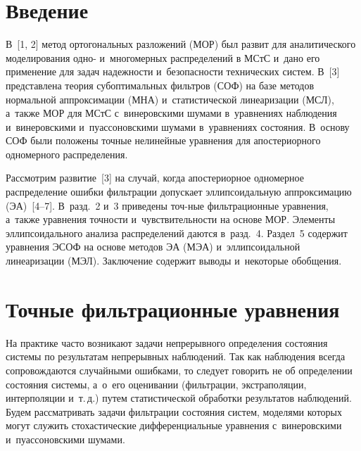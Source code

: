 


\thispagestyle{headings}

\begin{multicols}{2}

\label{st\stat}

\section{Введение}

В~[1, 2] метод ортогональных разложений (МОР)  был развит для аналитического 
моделирования одно- и~многомерных распределений в МСтС 
и~дано его применение для задач надежности и~без\-опас\-ности технических сис\-тем.
В~[3] представлена теория субоптимальных фильтров (СОФ) на базе методов нормальной 
аппроксимации (МНА) и~статистической линеаризации (МСЛ), а~также МОР для 
МСтС с~винеровскими шумами в~уравнениях наблюдения и~винеровскими и~пуассоновскими 
шумами в~уравнениях состояния.
В~основу СОФ были положены точные нелинейные уравнения для апостериорного одномерного 
распределения.

Рассмотрим развитие~[3] на случай, когда апостериорное одномерное распределение 
ошибки фильтрации допускает эллипсоидальную аппроксимацию (ЭА)~[4--7]. В~разд.~2 и~3 
приведены точ-\linebreak ные фильтрационные уравнения, а~также уравнения точности и~чувствительности 
на основе МОР. Элементы эллипсоидального анализа распределений даются в~разд.~4. 
Раздел~5 содержит уравнения ЭСОФ на основе методов ЭА
(МЭА) и~эллипсоидальной линеаризации (МЭЛ). Заключение содержит выводы 
и~некоторые обобщения.

\section{Точные фильтрационные уравнения}

\vspace*{-18pt}

На практике часто возникают задачи непрерывного
определения состояния системы по результатам непрерывных наблюдений.
Так как наблюдения всегда сопровождаются случайными ошибками, то
следует говорить не об определении состояния сис\-те\-мы, а~о~его
оценивании (фильтрации, экстраполяции, интерполяции и~т.\,д.) путем
статистической обработки результатов наблюдений. Будем рас\-смат\-ри\-вать
задачи фильтрации состояния сис\-тем, моделями которых могут служить
стохастические дифференциальные  уравнения с~винеровскими и~пуассоновскими шумами.


\end{multicols}
